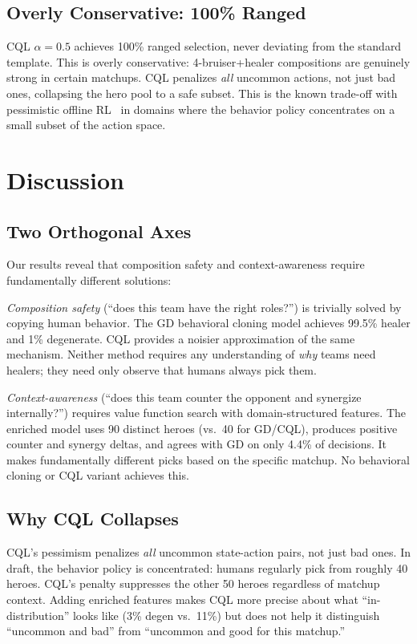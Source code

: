 \documentclass[journal]{IEEEtran}
\begin{document}
\subsection{Overly Conservative: 100\% Ranged}

CQL $\alpha = 0.5$ achieves 100\% ranged selection, never deviating from the standard template. This is overly conservative: 4-bruiser+healer compositions are genuinely strong in certain matchups. CQL penalizes \textit{all} uncommon actions, not just bad ones, collapsing the hero pool to a safe subset. This is the known trade-off with pessimistic offline RL~\cite{lyu2022mildly} in domains where the behavior policy concentrates on a small subset of the action space.

\section{Discussion}

\subsection{Two Orthogonal Axes}

Our results reveal that composition safety and context-awareness require fundamentally different solutions:

\textit{Composition safety} (``does this team have the right roles?'') is trivially solved by copying human behavior. The GD behavioral cloning model achieves 99.5\% healer and 1\% degenerate. CQL provides a noisier approximation of the same mechanism. Neither method requires any understanding of \textit{why} teams need healers; they need only observe that humans always pick them.

\textit{Context-awareness} (``does this team counter the opponent and synergize internally?'') requires value function search with domain-structured features. The enriched model uses 90 distinct heroes (vs.\ 40 for GD/CQL), produces positive counter and synergy deltas, and agrees with GD on only 4.4\% of decisions. It makes fundamentally different picks based on the specific matchup. No behavioral cloning or CQL variant achieves this.

\subsection{Why CQL Collapses}

CQL's pessimism penalizes \textit{all} uncommon state-action pairs, not just bad ones. In draft, the behavior policy is concentrated: humans regularly pick from roughly 40 heroes. CQL's penalty suppresses the other 50 heroes regardless of matchup context. Adding enriched features makes CQL more precise about what ``in-distribution'' looks like (3\% degen vs.\ 11\%) but does not help it distinguish ``uncommon and bad'' from ``uncommon and good for this matchup.''
\end{document}
